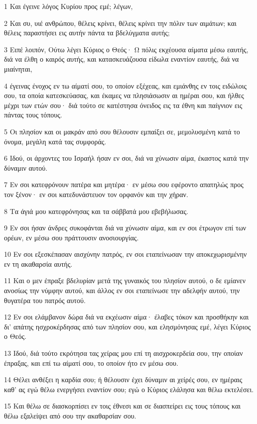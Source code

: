 \par 1 Και έγεινε λόγος Κυρίου προς εμέ; λέγων,
\par 2 Και συ, υιέ ανθρώπου, θέλεις κρίνει, θέλεις κρίνει την πόλιν των αιμάτων; και θέλεις παραστήσει εις αυτήν πάντα τα βδελύγματα αυτής;
\par 3 Ειπέ λοιπόν, Ούτω λέγει Κύριος ο Θεός· Ω πόλις εκχέουσα αίματα μέσω εαυτής, διά να έλθη ο καιρός αυτής, και κατασκευάζουσα είδωλα εναντίον εαυτής, διά να μιαίνηται,
\par 4 έγεινας ένοχος εν τω αίματί σου, το οποίον εξέχεας, και εμιάνθης εν τοις ειδώλοις σου, τα οποία κατεσκεύασας, και έκαμες να πλησιάσωσιν αι ημέραι σου, και ήλθες μέχρι των ετών σου· διά τούτο σε κατέστησα όνειδος εις τα έθνη και παίγνιον εις πάντας τους τόπους.
\par 5 Οι πλησίον και οι μακράν από σου θέλουσιν εμπαίξει σε, μεμολυσμένη κατά το όνομα, μεγάλη κατά τας συμφοράς.
\par 6 Ιδού, οι άρχοντες του Ισραήλ ήσαν εν σοι, διά να χύνωσιν αίμα, έκαστος κατά την δύναμιν αυτού.
\par 7 Εν σοι κατεφρόνουν πατέρα και μητέρα· εν μέσω σου εφέροντο απατηλώς προς τον ξένον· εν σοι κατεδυνάστευον τον ορφανόν και την χήραν.
\par 8 Τα άγιά μου κατεφρόνησας και τα σάββατά μου εβεβήλωσας.
\par 9 Εν σοι ήσαν άνδρες συκοφάνται διά να χύνωσιν αίμα, και εν σοι έτρωγον επί των ορέων, εν μέσω σου πράττουσιν ανοσιουργίας.
\par 10 Εν σοι εξεσκέπασαν αισχύνην πατρός, εν σοι εταπείνωσαν την αποκεχωρισμένην εν τη ακαθαρσία αυτής.
\par 11 Και ο μεν έπραξε βδελυρίαν μετά της γυναικός του πλησίον αυτού, ο δε εμίανεν ανοσίως την νύμφην αυτού, και άλλος εν σοι εταπείνωσε την αδελφήν αυτού, την θυγατέρα του πατρός αυτού.
\par 12 Εν σοι ελάμβανον δώρα διά να εκχέωσιν αίμα· έλαβες τόκον και προσθήκην και δι' απάτης ησχροκέρδησας από των πλησίον σου, και ελησμόνησας εμέ, λέγει Κύριος ο Θεός.
\par 13 Ιδού, διά τούτο εκρότησα τας χείρας μου επί τη αισχροκερδεία σου, την οποίαν έπραξας, και επί τω αίματί σου, το οποίον ήτο εν μέσω σου.
\par 14 Θέλει ανθέξει η καρδία σου; ή θέλουσιν έχει δύναμιν αι χείρές σου, εν ημέραις καθ' ας εγώ θέλω ενεργήσει εναντίον σου; εγώ ο Κύριος ελάλησα και θέλω εκτελέσει.
\par 15 Και θέλω σε διασκορπίσει εν τοις έθνεσι και σε διασπείρει εις τους τόπους και θέλω εξαλείψει από σου την ακαθαρσίαν σου.
